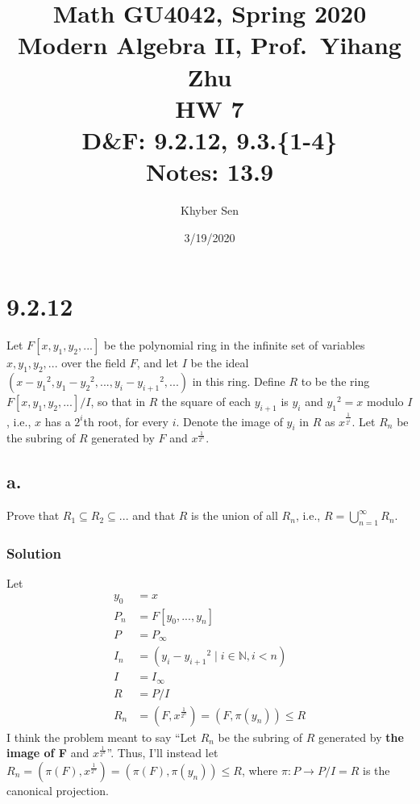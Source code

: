 \documentclass[fleqn]{article}
\title{
Math GU4042, Spring 2020 \\
Modern Algebra II, Prof.\ Yihang Zhu \\
HW 7 \\
D\&F: 9.2.12, 9.3.\{1-4\} \\
Notes: 13.9 \\
}
\author{Khyber Sen}
\date{3/19/2020}
\begin{document}
    
    \maketitle
    
    \section{9.2.12}
    Let $F[x, y_1, y_2, ...]$ be the polynomial ring in the infinite set of variables $x, y_1, y_2, ...$ over the field $F$, and let $I$ be the ideal $\left(x - {y_1}^2, y_1 - {y_2}^2, ..., y_i - {y_{i + 1}}^2, ...\right)$ in this ring.  Define $R$ to be the ring $F[x, y_1, y_2, ...]/I$, so that in $R$ the square of each $y_{i + 1}$ is $y_i$ and ${y_1}^2 = x$ modulo $I$, i.e., $x$ has a $2^i$th root, for every $i$.  Denote the image of $y_i$ in $R$ as $x^{\frac{1}{2^i}}$.  Let $R_n$ be the subring of $R$ generated by $F$ and $x^{\frac{1}{2^n}}$.
        
        \subsection{a.}
        Prove that $R_1 \subseteq R_2 \subseteq ...$ and that $R$ is the union of all $R_n$, i.e., $R = \bigcup\limits_{n = 1}^{\infty} R_n$.
            
            \subsubsection{Solution}
            Let
            \begin{align}
                y_0 &= x \\
                P_n &= F[y_0, ..., y_n] \\
                P &= P_\infty \\
                I_n &= \left(y_i - {y_{i + 1}}^2 \mid i \in \mathbb{N}, i < n\right) \\
                I &= I_\infty \\
                R &= P/I \\
                R_n &= \left(F, x^{\frac{1}{2^n}}\right) = (F, \pi(y_n)) \leq R
            \end{align}
            I think the problem meant to say ``Let $R_n$ be the subring of $R$ generated by \textbf{the image of F} and $x^\frac{1}{2^n}$''.  Thus, I'll instead let $R_n = \left(\pi(F), x^{\frac{1}{2^n}}\right) = (\pi(F), \pi(y_n)) \leq R$, where $\pi: P \to P/I = R$ is the canonical projection.
            
\end{document}

